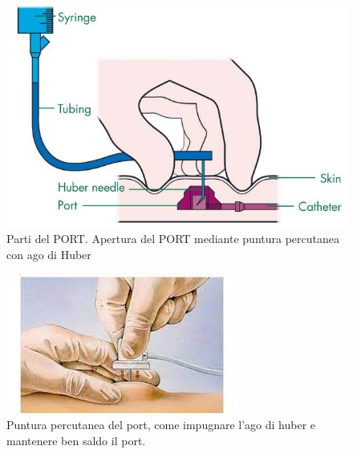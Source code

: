 \begin{figure}[H]
    \begin{center}
    \includegraphics[width=0.4\columnwidth]{img/port-a-cath-picc.jpeg}
    \vspace{-3mm}
    \end{center}
    \caption{Parti del PORT. Apertura del PORT mediante puntura percutanea con ago di Huber
    \cite{img43}}
    \label{fig:FIGURE_4.6}
\end{figure}

\begin{figure}[H]
    \begin{center}
    \includegraphics[width=0.4\columnwidth]{img/port2.jpeg}
    \vspace{-3mm}
    \end{center}
    \caption{Puntura percutanea del port, come impugnare l’ago di huber e mantenere ben saldo il port.
    \cite{img44}}
    \label{fig:FIGURE_4.7}
\end{figure}

